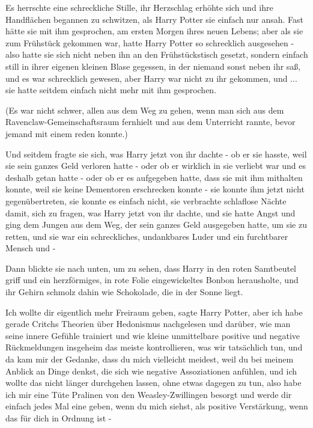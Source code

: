 Es herrschte eine schreckliche Stille, ihr Herzschlag erhöhte sich und ihre
Handflächen begannen zu schwitzen, als Harry Potter sie einfach nur ansah. Fast
hätte sie mit ihm gesprochen, am ersten Morgen ihres neuen Lebens; aber als sie
zum Frühstück gekommen war, hatte Harry Potter so schrecklich ausgesehen - also
hatte sie sich nicht neben ihn an den Frühstückstisch gesetzt, sondern einfach
still in ihrer eigenen kleinen Blase gegessen, in der niemand sonst neben ihr
saß, und es war schrecklich gewesen, aber Harry war nicht zu ihr gekommen, und
... sie hatte seitdem einfach nicht mehr mit ihm gesprochen.

(Es war nicht schwer, allen aus dem Weg zu gehen, wenn man sich aus dem
Ravenclaw-Gemeinschaftsraum fernhielt und aus dem Unterricht rannte, bevor
jemand mit einem reden konnte.)

Und seitdem fragte sie sich, was Harry jetzt von ihr dachte - ob er sie hasste,
weil sie sein ganzes Geld verloren hatte - oder ob er wirklich in sie verliebt
war und es deshalb getan hatte - oder ob er es aufgegeben hatte, dass sie mit
ihm mithalten konnte, weil sie keine Dementoren erschrecken konnte - sie konnte
ihm jetzt nicht gegenübertreten, sie konnte es einfach nicht, sie verbrachte
schlaflose Nächte damit, sich zu fragen, was Harry jetzt von ihr dachte, und sie
hatte Angst und ging dem Jungen aus dem Weg, der sein ganzes Geld ausgegeben
hatte, um sie zu retten, und sie war ein schreckliches, undankbares Luder und
ein furchtbarer Mensch und -

Dann blickte sie nach unten, um zu sehen, dass Harry in den roten Samtbeutel
griff und ein herzförmiges, in rote Folie eingewickeltes Bonbon herausholte, und
ihr Gehirn schmolz dahin wie Schokolade, die in der Sonne liegt.

\glqq Ich wollte dir eigentlich mehr Freiraum geben\grqq{}, sagte Harry Potter,
\glqq aber ich habe gerade Critchs Theorien über Hedonismus nachgelesen und
darüber, wie man seine innere Gefühle trainiert und wie kleine unmittelbare
positive und negative Rückmeldungen insgeheim das meiste kontrollieren, was wir
tatsächlich tun, und da kam mir der Gedanke, dass du mich vielleicht meidest,
weil du bei meinem Anblick an Dinge denkst, die sich wie negative Assoziationen
anfühlen, und ich wollte das nicht länger durchgehen lassen, ohne etwas dagegen
zu tun, also habe ich mir eine Tüte Pralinen von den Weasley-Zwillingen besorgt
und werde dir einfach jedes Mal eine geben, wenn du mich siehst, als positive
Verstärkung, wenn das für dich in Ordnung ist -\grqq{}

